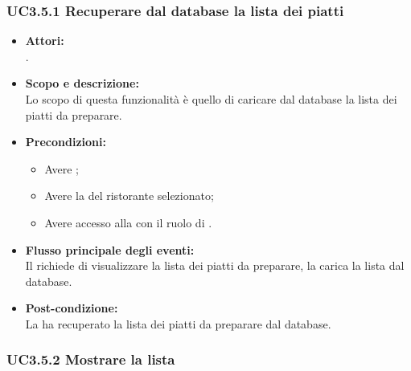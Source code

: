 \subsubsection{UC3.5.1 Recuperare dal database la lista dei piatti} \label{UC3.5.1}

\begin{itemize}
	\item \textbf{Attori:}
	\\.
	\item \textbf{Scopo e descrizione:} 
	\\Lo scopo di questa funzionalità è quello di caricare dal database la lista dei piatti da preparare.
	\item \textbf{Precondizioni:}
	\begin{itemize}
		\item Avere ;
		\item Avere la  del ristorante selezionato;
		\item Avere accesso alla  con il ruolo di .
	\end{itemize}
	\item \textbf{Flusso principale degli eventi:}
	\\Il {} richiede di visualizzare la lista dei piatti da preparare, la  carica la lista dal database.
	\item \textbf{Post-condizione:}
	\\La {} ha recuperato la lista dei piatti da preparare dal database.
\end{itemize}

\subsubsection{UC3.5.2 Mostrare la lista} \label{UC3.5.2}

